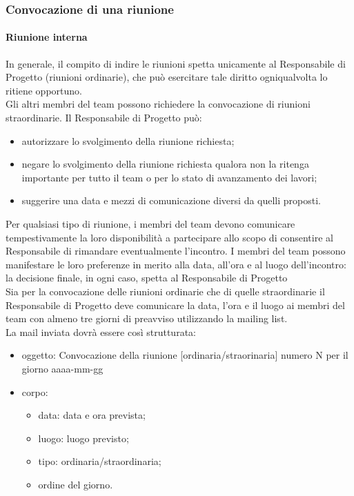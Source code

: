 		\subsubsection{Convocazione di una riunione}
			\paragraph{Riunione interna}
				In generale, il compito di indire le riunioni spetta unicamente al Responsabile di Progetto (riunioni ordinarie), che può esercitare tale diritto ogniqualvolta lo ritiene opportuno.\\
				Gli altri membri del team possono richiedere la convocazione di riunioni straordinarie. Il Responsabile di Progetto può:
				\begin{itemize}
					\item autorizzare lo svolgimento della riunione richiesta;
					\item negare lo svolgimento della riunione richiesta qualora non la ritenga importante per tutto il team o per lo stato di avanzamento dei lavori;
					\item suggerire una data e mezzi di comunicazione diversi da quelli proposti.
				\end{itemize}
				Per qualsiasi tipo di riunione, i membri del team devono comunicare tempestivamente la loro disponibilità a partecipare allo scopo di consentire al Responsabile di rimandare eventualmente l'incontro. I membri del team possono manifestare le loro preferenze in merito alla data, all'ora e al luogo dell'incontro: la decisione finale, in ogni caso, spetta al Responsabile di Progetto\\
				Sia per la convocazione delle riunioni ordinarie che di quelle straordinarie il Responsabile di Progetto deve comunicare la data, l'ora e il luogo ai membri del team con almeno tre giorni di preavviso utilizzando la mailing list.\\
				La mail inviata dovrà essere così strutturata:
				\begin{itemize}
					\item oggetto: Convocazione della riunione [ordinaria/straorinaria] numero N per il giorno aaaa-mm-gg
					\item corpo:
					\begin{itemize}
						\item data: data e ora prevista;
						\item luogo: luogo previsto;
						\item tipo: ordinaria/straordinaria;
						\item ordine del giorno.
					\end{itemize}
				\end{itemize}
